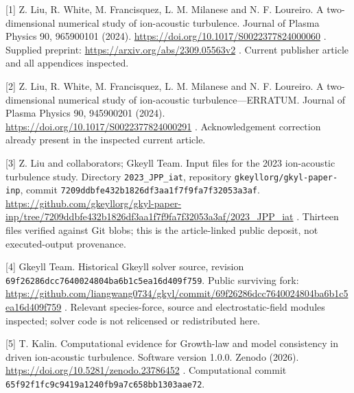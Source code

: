 {[}1{]} Z. Liu, R. White, M. Francisquez, L. M. Milanese and N. F.
Loureiro. A two-dimensional numerical study of ion-acoustic turbulence.
Journal of Plasma Physics 90, 965900101 (2024).
\url{https://doi.org/10.1017/S0022377824000060} . Supplied preprint:
\url{https://arxiv.org/abs/2309.05563v2} . Current publisher article and
all appendices inspected.

{[}2{]} Z. Liu, R. White, M. Francisquez, L. M. Milanese and N. F.
Loureiro. A two-dimensional numerical study of ion-acoustic
turbulence---ERRATUM. Journal of Plasma Physics 90, 945900201 (2024).
\url{https://doi.org/10.1017/S0022377824000291} . Acknowledgement
correction already present in the inspected current article.

{[}3{]} Z. Liu and collaborators; Gkeyll Team. Input files for the 2023
ion-acoustic turbulence study. Directory \nolinkurl{2023_JPP_iat},
repository \nolinkurl{gkeyllorg/gkyl-paper-inp}, commit
\nolinkurl{7209ddbfe432b1826df3aa1f7f9fa7f32053a3af}.
\url{https://github.com/gkeyllorg/gkyl-paper-inp/tree/7209ddbfe432b1826df3aa1f7f9fa7f32053a3af/2023_JPP_iat}
. Thirteen files verified against Git blobs; this is the article-linked
public deposit, not executed-output provenance.

{[}4{]} Gkeyll Team. Historical Gkeyll solver source, revision
\nolinkurl{69f26286dcc7640024804ba6b1c5ea16d409f759}. Public surviving
fork:
\url{https://github.com/liangwang0734/gkyl/commit/69f26286dcc7640024804ba6b1c5ea16d409f759}
. Relevant species-force, source and electrostatic-field modules
inspected; solver code is not relicensed or redistributed here.

{[}5{]} T. Kalin. Computational evidence for Growth-law and model
consistency in driven ion-acoustic turbulence. Software version 1.0.0.
Zenodo (2026). \url{https://doi.org/10.5281/zenodo.23786452} .
Computational commit \nolinkurl{65f92f1fc9c9419a1240fb9a7c658bb1303aae72}.

\endgroup
